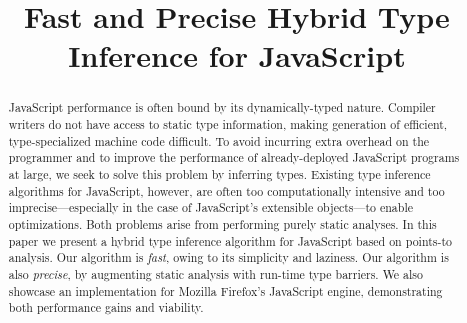\documentclass[preprint]{sigplanconf}
\title{Fast and Precise Hybrid Type Inference for JavaScript}
\begin{document}
\maketitle

\begin{abstract}
JavaScript performance is often bound by its dynamically-typed nature. Compiler writers do not have access to static type information, making generation of efficient, type-specialized machine code difficult. To avoid incurring extra overhead on the programmer and to improve the performance of already-deployed JavaScript programs at large, we seek to solve this problem by inferring types. Existing type inference algorithms for JavaScript, however, are often too computationally intensive and too imprecise---especially in the case of JavaScript's extensible objects---to enable optimizations. Both problems arise from performing purely static analyses. In this paper we present a hybrid type inference algorithm for JavaScript based on points-to analysis. Our algorithm is \emph{fast}, owing to its simplicity and laziness. Our algorithm is also \emph{precise}, by augmenting static analysis with run-time type barriers. We also showcase an implementation for Mozilla Firefox's JavaScript engine, demonstrating both performance gains and viability.
\end{abstract}

%
%
%
%
%
%
%
\end{document}
